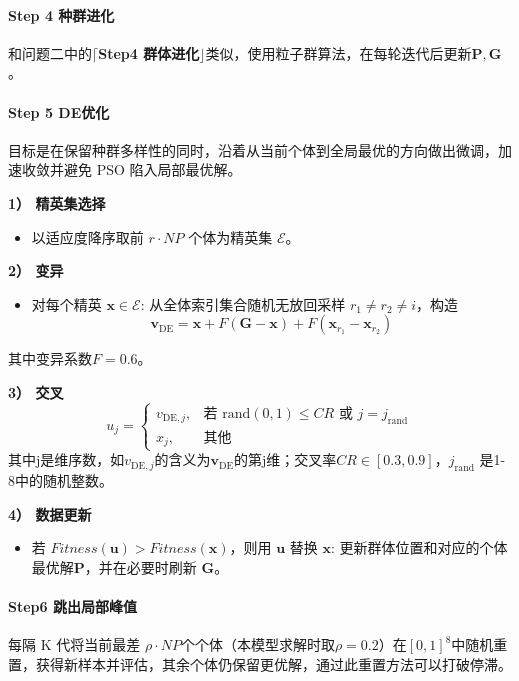 \documentclass[withoutpreface]{cumcmthesis}
\begin{document}
\paragraph{Step 4 种群进化}
和问题二中的$\lceil$\textbf{Step4 群体进化}$\rfloor $类似，使用粒子群算法，在每轮迭代后更新$\mathbf{P,G}$。
\paragraph{Step 5 DE优化}

目标是在保留种群多样性的同时，沿着从当前个体到全局最优的方向做出微调，加速收敛并避免 PSO 陷入局部最优解。

\noindent \textbf{1） 精英集选择}
\begin{itemize}
    \item 以适应度降序取前 $r \cdot NP$ 个体为精英集 $\mathcal{E}$。
\end{itemize}


\noindent \textbf{2） 变异}
\begin{itemize}
    \item 对每个精英 $\mathbf{x} \in \mathcal{E}$: 从全体索引集合随机无放回采样 $r_1 \neq r_2 \neq i$，构造
    \begin{equation}
        \mathbf{v}_{\text{DE}} = \mathbf{x} + F \left( \mathbf{G} - \mathbf{x} \right) + F \left( \mathbf{x}_{r_1} - \mathbf{x}_{r_2} \right)
    \end{equation}
\end{itemize}
其中变异系数$F =0.6$。

\noindent \textbf{3） 交叉}
    \begin{equation}
        u_j = 
    \begin{cases} 
    v_{\text{DE}, j}, & \text{若 } \text{rand}(0,1) \leq CR \text{ 或 } j = j_{\text{rand}} \\
    x_j, & \text{其他}
    \end{cases} 
    \end{equation}
其中j是维序数，如$v_{\text{DE}, j}$的含义为$\mathbf{v}_{\text{DE}}$的第j维；交叉率$CR \in [0.3, 0.9]$，$j_{\text{rand}}$ 是1-8中的随机整数。

\noindent \textbf{4） 数据更新}
\begin{itemize}
    \item 若 $Fitness(\mathbf{u}) > Fitness(\mathbf{x})$，则用 $\mathbf{u}$ 替换 $\mathbf{x}$: 更新群体位置和对应的个体最优解$\mathbf{P}$，并在必要时刷新 $\mathbf{G}$。
\end{itemize}

\paragraph{Step6 跳出局部峰值}
每隔 K 代将当前最差 $\rho \cdot NP$个个体（本模型求解时取$\rho= 0.2$）在$[0,1]^8$中随机重置，获得新样本并评估，其余个体仍保留更优解，通过此重置方法可以打破停滞。
\end{document}

